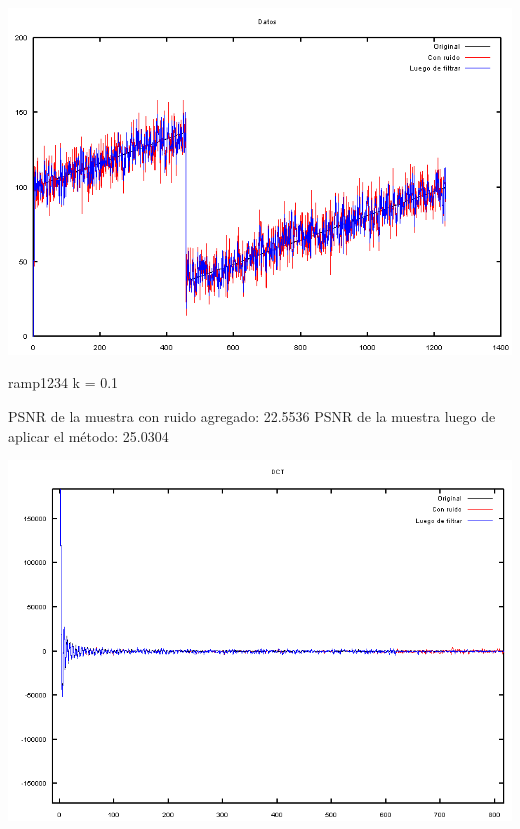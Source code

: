 \documentclass[a4paper,10pt,twoside]{article}
\begin{document}
\begin{center}
\includegraphics[width=15cm]{graficos/ramp_aditivo_atenuar_muestra.png} 
\end{center}


ramp1234 k = 0.1

PSNR de la muestra con ruido agregado: 22.5536
PSNR de la muestra luego de aplicar el método: 25.0304


\begin{center}
\includegraphics[width=15cm]{graficos/ramp_aditivo_atenuar_dct.png} 
\end{center}
\end{document}
